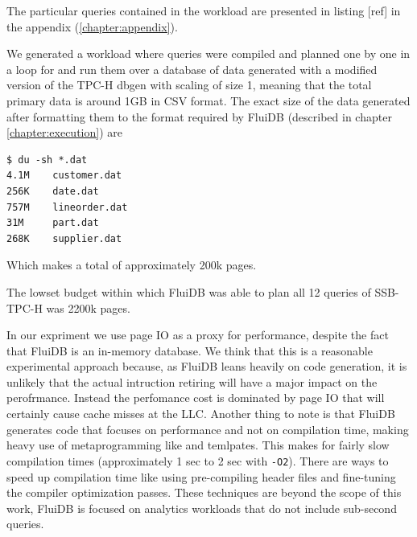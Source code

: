 The particular queries contained in the workload are presented in
listing [ref] in the appendix (\ref{chapter:appendix}).

We generated a workload where queries were compiled and planned one by
one in a loop for and run them over a database of data generated with
a modified version of the TPC-H dbgen
\cite{perivolaropoulosFakedrakeSsbdbgen2021a} with scaling of size 1,
meaning that the total primary data is around 1GB in CSV format. The
exact size of the data generated after formatting them to the format
required by FluiDB (described in chapter \ref{chapter:execution}) are

\begin{verbatim}
$ du -sh *.dat
4.1M    customer.dat
256K    date.dat
757M    lineorder.dat
31M     part.dat
268K    supplier.dat
\end{verbatim}

Which makes a total of approximately 200k pages.

The lowset budget within which FluiDB was able to plan all 12 queries
of SSB-TPC-H was 2200k pages.

In our expriment we use page IO as a proxy for performance, despite
the fact that FluiDB is an in-memory database. We think that this is a
reasonable experimental approach because, as FluiDB leans heavily on
code generation, it is unlikely that the actual intruction retiring
will have a major impact on the perofrmance. Instead the perfomance
cost is dominated by page IO that will certainly cause cache misses at
the LLC. Another thing to note is that FluiDB generates code that
focuses on performance and not on compilation time, making heavy use
of metaprogramming like  and temlpates.  This makes for
fairly slow compilation times (approximately 1 sec to 2 sec with
\texttt{-O2}). There are ways to speed up compilation time like using
pre-compiling header files \cite{PrecompiledHeadersPCH} and
fine-tuning the compiler optimization passes. These techniques are
beyond the scope of this work, FluiDB is focused on analytics
workloads that do not include sub-second queries.

